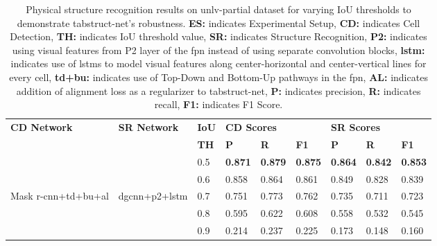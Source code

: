 \documentclass[runningheads]{llncs}
\begin{document}
\begin{table}
\addtolength{\tabcolsep}{-1.0pt}
\begin{center}
\begin{tabular}{|l |l| l| l l l| l l l|} \hline
\textbf{CD Network} & \textbf{SR Network} &\textbf{IoU} &\multicolumn{3}{l|}{\textbf{CD Scores}} &\multicolumn{3}{l|}{\textbf{SR Scores}} \\ \cline{4-9}
 &  &\textbf{TH} &\textbf{P} &\textbf{R} &\textbf{F1} &\textbf{P} &\textbf{R} &\textbf{F1} \\ \hline
 &  &0.5	&\textbf{0.871}	&\textbf{0.879}	&\textbf{0.875}	&\textbf{0.864}	&\textbf{0.842}	&\textbf{0.853} \\  
 &      &0.6 &0.858	&0.864	&0.861	&0.849	&0.828	&0.839 \\
Mask {\sc r-cnn}+{\sc td}+{\sc bu}+{\sc al} &{\sc dgcnn}+{\sc p}2+{\sc lstm}  &0.7 &0.751 &0.773 &0.762	&0.735 &0.711 &0.723 \\
 &      &0.8 &0.595	&0.622 &0.608 &0.558 &0.532	&0.545 \\
 &      &0.9 &0.214	&0.237 &0.225 &0.173 &0.148	&0.160 \\ \hline
 \end{tabular}
\end{center}
\caption{Physical structure recognition results on {\sc unlv}-partial dataset for varying IoU thresholds to demonstrate {\sc t}ab{\sc s}truct-{\sc n}et's robustness. \textbf{ES:} indicates Experimental Setup, \textbf{CD:} indicates Cell Detection, \textbf{TH:} indicates IoU threshold value, \textbf{SR:} indicates Structure Recognition, \textbf{P2:} indicates using visual features from P2 layer of the {\sc fpn} instead of using separate convolution blocks, \textbf{{\sc lstm}:} indicates use of {\sc lstm}s to model visual features along center-horizontal and center-vertical lines for every cell, \textbf{{\sc td}+{\sc bu}:} indicates use of Top-Down and Bottom-Up pathways in the {\sc fpn}, \textbf{AL:} indicates addition of alignment loss as a regularizer to {\sc t}ab{\sc s}truct-{\sc n}et, \textbf{P:} indicates precision, \textbf{R:} indicates recall, \textbf{F1:} indicates F1 Score. \label{table_varying_ious_physical_unlv-partial}}
\vspace{-1em}
\end{table}
\end{document}

